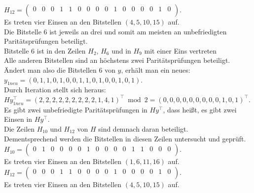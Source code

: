 \begin{Beispiel}
        $H_{12}= \left( \begin{array}{rrrrrrrrrrrrrrrr}
            0 & 0 & 0 & 1 & 1 & 0 & 0 & 0 & 0 & 1 & 0 & 0 & 0 & 0 & 1 & 0 \\
           \end{array}\right). 
        $\\
        Es treten vier Einsen an den Bitstellen $(4, 5, 10, 15)$ auf.\\
        
        Die Bitstelle $6$ ist jeweils an drei und somit am meisten an unbefriedigten Paritätsprüfungen beteiligt.\\ 
        Bitstelle $6$ ist in den Zeilen $H_2$, $H_6$ und in $H_9$ mit einer Eins vertreten\\ 
        Alle anderen Bitstellen sind an höchstens zwei Paritätsprüfungen beteiligt.\\
         
        Ändert man also die Bitstellen $6$ von $y$, erhält man ein neues:\\
        $y_{1neu} = (0,1,1,0,1,0,0,1,1,0,1,0,0,1,0,1).$\\
        
        
        Durch Iteration stellt sich heraus:\\
        $Hy_{1neu}^\intercal = (2,2,2,2,2,2,2,2,2,1,4,1)^\intercal \bmod 2 =(0,0,0,0,0,0,0,0,0,1,0,1)^\intercal.$\\
        
        Es gibt zwei unbefriedigte Paritätsprüfungen in $Hy^\intercal$,
        dass hei\ss{}t, es gibt zwei Einsen in $Hy^\intercal.$\\
        Die Zeilen $H_{10}$ und $H_{12}$ von $H$ sind demnach daran beteiligt.\\ 
        Dementsprechend werden die Bitstellen in diesen Zeilen untersucht und geprüft.\\
        
        $H_{10}= \left( \begin{array}{rrrrrrrrrrrrrrrr}
            0 & 1 & 0 & 0 & 0 & 0 & 1 & 0 & 0 & 0 & 0 & 1 & 1 & 0 & 0 & 0 \\
           \end{array}\right). 
        $\\
        Es treten vier Einsen an den Bitstellen $(1, 6, 11, 16)$ auf.\\
        
        $H_{12}= \left( \begin{array}{rrrrrrrrrrrrrrrr}
            0 & 0 & 0 & 1 & 1 & 0 & 0 & 0 & 0 & 1 & 0 & 0 & 0 & 0 & 1 & 0 \\
           \end{array}\right). 
        $\\
        Es treten vier Einsen an den Bitstellen $(4, 5, 10, 15)$ auf.\\
        

\end{Beispiel}

